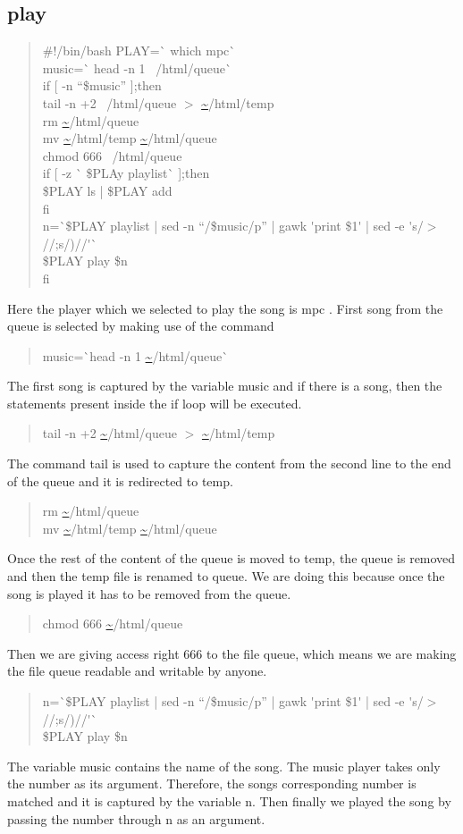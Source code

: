 \subsection*{play}
\begin{quote}
\#!/bin/bash
PLAY=\`{} which mpc\`{} \\
music=\`{} head -n 1 ~/html/queue\`{} \\
if [ -n ``\$music'' ];then \\
	tail -n +2 ~/html/queue $>$ \url{~}/html/temp \\
	rm \url{~}/html/queue \\
	mv \url{~}/html/temp  \url{~}/html/queue \\
	chmod 666 ~/html/queue \\
	if [ -z \`{} \$PLAy playlist\`{} ];then \\
	\$PLAY ls | \$PLAY add \\
	fi \\
        n=\`{}\$PLAY playlist | sed -n ``/\$music/p'' | gawk \'{}{print \$1}\'{} | sed -e \'{}s/$>$//;s/)//\'{}\`{} \\
	\$PLAY play \$n  \\
fi
\end{quote}
Here the player which we selected to play the song is mpc . First song from the queue is selected  by making use of the command
\begin{quote}
music=\`{}head -n 1 \url{~}/html/queue\`{}
\end{quote}
The first song is captured by the variable music and if there is a song, then the statements present inside the if loop will be executed. 
\begin{quote}
tail -n +2 \url{~}/html/queue $>$ \url{~}/html/temp
\end{quote}
The command tail is used to capture the content from the second line to the end of the queue and it is redirected to temp.
\begin{quote}
rm  \url{~}/html/queue \\
mv \url{~}/html/temp  \url{~}/html/queue
\end{quote}
Once the rest of the content of the queue is moved to temp, the queue is removed and then the temp file is renamed to queue. We are doing this because once the song is played it has to be removed from the queue. 
\begin{quote}
chmod 666 \url{~}/html/queue
\end{quote}
Then we are giving access right 666 to the file queue, which means we are making the file queue readable and writable by anyone.
\begin{quote}
n=\`{}\$PLAY playlist | sed -n ``/\$music/p'' | gawk \'{}{print \$1}\'{} | sed -e \'{}s/$>$//;s/)//\'{}\`{} \\
	\$PLAY play \$n  \\
\end{quote}
The variable music contains the name of the song. The music player takes only the number as its argument. Therefore, the songs corresponding number is matched and it is captured by the variable n. Then finally we played the song by passing the number through n as an argument. 
